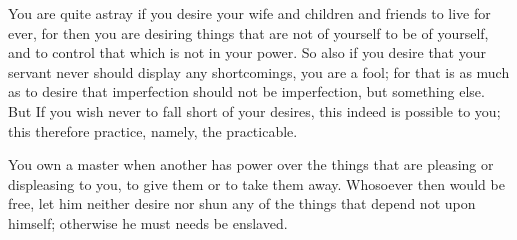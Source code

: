 You are quite astray  if you desire your wife and children  and friends to live
for ever, for  then you are desiring things  that are not of yourself  to be of
yourself, and to control that which is not in your power. So also if you desire
that your  servant never should display  any shortcomings, you are  a fool; for
that is as much as to desire  that imperfection should not be imperfection, but
something else.  But If  you wish  never to  fall short  of your  desires, this
indeed is possible to you; this therefore practice, namely, the practicable.

You own a  master when another has  power over the things that  are pleasing or
displeasing to you, to give them or  to take them away. Whosoever then would be
free, let him  neither desire nor shun  any of the things that  depend not upon
himself; otherwise he must needs be enslaved.
